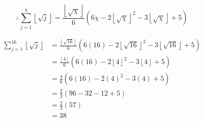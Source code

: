 \documentclass[a4paper]{article}
\begin{document}
\[\therefore\boxed{\sum\limits_{j=1}^\chi\left\lfloor\sqrt j\right\rfloor=\frac{\left\lfloor\sqrt \chi\right\rfloor}6\left(6\chi-2\left\lfloor\sqrt \chi\right\rfloor^2-3\left\lfloor\sqrt \chi\right\rfloor+5\right)}\]

\[\begin{aligned}
    \sum\limits_{j=1}^{16}\left\lfloor\sqrt j\right\rfloor&=\frac{\left\lfloor\sqrt{16}\right\rfloor}6\left(6(16)-2\left\lfloor\sqrt{16}\right\rfloor^2-3\left\lfloor\sqrt{16}\right\rfloor+5\right)\\
&=\frac{\left\lfloor4\right\rfloor}6\left(6(16)-2\left\lfloor4\right\rfloor^2-3\left\lfloor4\right\rfloor+5\right)\\
&=\frac46\left(6(16)-2{(4)}^2-3(4)+5\right)\\
&=\frac23\left(96-32-12+5\right)\\
&=\frac23\left(57\right)\\
&=\boxed{38}
\end{aligned}\]
\end{document}

